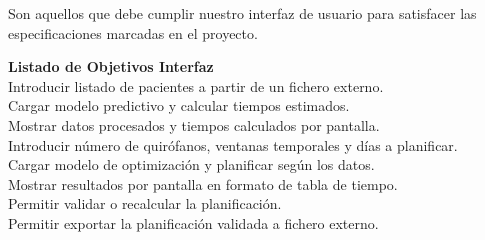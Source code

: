 Son aquellos que debe cumplir nuestro interfaz de usuario para satisfacer las especificaciones marcadas en el proyecto.

{\textbf{Listado de Objetivos Interfaz}\\}{ 
 Introducir listado de pacientes a partir de un fichero externo. \\
 Cargar modelo predictivo y calcular tiempos estimados. \\
 Mostrar datos procesados y tiempos calculados por pantalla. \\ 
 Introducir número de quirófanos, ventanas temporales y días a planificar. \\
 Cargar modelo de optimización y planificar según los datos.\\
 Mostrar resultados por pantalla en formato de tabla de tiempo. \\ 
 Permitir validar o recalcular la planificación. \\
 Permitir exportar la planificación validada a fichero externo. \\
 } 
